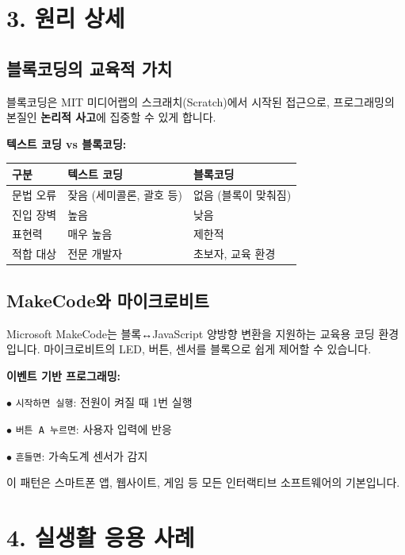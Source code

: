 \documentclass[11pt,a4paper]{article}
\begin{document}
\section*{3. 원리 상세}

\subsection*{블록코딩의 교육적 가치}

블록코딩은 MIT 미디어랩의 스크래치(Scratch)에서 시작된 접근으로, 프로그래밍의 본질인 \textbf{논리적 사고}에 집중할 수 있게 합니다.


\textbf{텍스트 코딩 vs 블록코딩:}

\begin{center}
\renewcommand{\arraystretch}{1.4}
\begin{tabular}{|p{2.5cm}|p{6.8cm}|p{5.7cm}|}
\hline
\rowcolor{tableheader}
\textbf{구분} & \textbf{텍스트 코딩} & \textbf{블록코딩} \\
\hline
문법 오류 & 잦음 (세미콜론, 괄호 등) & 없음 (블록이 맞춰짐) \\
\hline
진입 장벽 & 높음 & 낮음 \\
\hline
표현력 & 매우 높음 & 제한적 \\
\hline
적합 대상 & 전문 개발자 & 초보자, 교육 환경 \\
\hline
\end{tabular}
\end{center}

\subsection*{MakeCode와 마이크로비트}

Microsoft MakeCode는 블록↔JavaScript 양방향 변환을 지원하는 교육용 코딩 환경입니다. 마이크로비트의 LED, 버튼, 센서를 블록으로 쉽게 제어할 수 있습니다.


\textbf{이벤트 기반 프로그래밍:}

$\bullet$ \texttt{시작하면 실행}: 전원이 켜질 때 1번 실행

$\bullet$ \texttt{버튼 A 누르면}: 사용자 입력에 반응

$\bullet$ \texttt{흔들면}: 가속도계 센서가 감지


이 패턴은 스마트폰 앱, 웹사이트, 게임 등 모든 인터랙티브 소프트웨어의 기본입니다.



\section*{4. 실생활 응용 사례}
\end{document}
